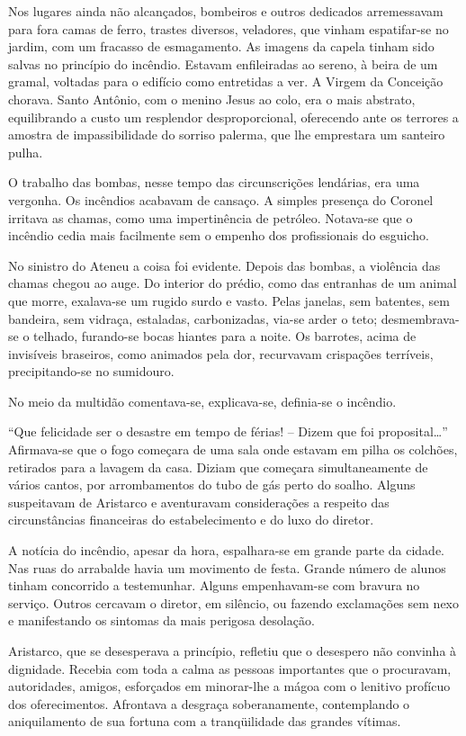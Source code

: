 Nos lugares ainda não alcançados, bombeiros e
outros dedicados arremessavam para fora camas de ferro, trastes
diversos, veladores, que vinham espatifar{}-se no jardim, com um
fracasso de esmagamento. As imagens da capela tinham sido salvas no
princípio do incêndio. Estavam enfileiradas ao sereno, à beira de um
gramal, voltadas para o edifício como entretidas a ver. A Virgem da
Conceição chorava. Santo Antônio, com o menino Jesus ao colo, era o
mais abstrato, equilibrando a custo um resplendor desproporcional,
oferecendo ante os terrores a amostra de impassibilidade do sorriso
palerma, que lhe emprestara um santeiro pulha. 

O trabalho das bombas,
nesse tempo das circunscrições lendárias, era uma vergonha. Os
incêndios acabavam de cansaço. A simples presença do Coronel irritava
as chamas, como uma impertinência de petróleo. Notava{}-se que o
incêndio cedia mais facilmente sem o empenho dos profissionais do
esguicho. 

No sinistro do Ateneu a coisa foi evidente. Depois das
bombas, a violência das chamas chegou ao auge. Do interior do prédio,
como das entranhas de um animal que morre, exalava{}-se um rugido surdo
e vasto. Pelas janelas, sem batentes, sem bandeira, sem vidraça,
estaladas, carbonizadas, via{}-se arder o teto; desmembrava{}-se o
telhado, furando{}-se bocas hiantes para a noite. Os barrotes, acima de
invisíveis braseiros, como animados pela dor, recurvavam crispações
terríveis, precipitando{}-se no sumidouro. 

No meio da multidão comentava{}-se, explicava{}-se, definia{}-se o incêndio. 

``Que felicidade ser o desastre em tempo de férias! -- Dizem que foi
proposital\ldots'' Afirmava{}-se que o fogo começara de uma sala onde
estavam em pilha os colchões, retirados para a lavagem da casa. Diziam
que começara simultaneamente de vários cantos, por arrombamentos do
tubo de gás perto do soalho. Alguns suspeitavam de Aristarco e
aventuravam considerações a respeito das circunstâncias financeiras do
estabelecimento e do luxo do diretor. 

A notícia do incêndio, apesar da
hora, espalhara{}-se em grande parte da cidade. Nas ruas do arrabalde
havia um movimento de festa. Grande número de alunos tinham concorrido
a testemunhar. Alguns empenhavam{}-se com bravura no serviço. Outros
cercavam o diretor, em silêncio, ou fazendo 
exclamações sem nexo e manifestando os sintomas da mais perigosa
desolação. 

Aristarco, que se desesperava a princípio, refletiu que o
desespero não convinha à dignidade. Recebia com toda a calma as pessoas
importantes que o procuravam, autoridades, amigos, esforçados em
minorar{}-lhe a mágoa com o lenitivo profícuo dos oferecimentos.
Afrontava a desgraça soberanamente, contemplando o aniquilamento de sua
fortuna com a tranqüilidade das grandes vítimas. 

